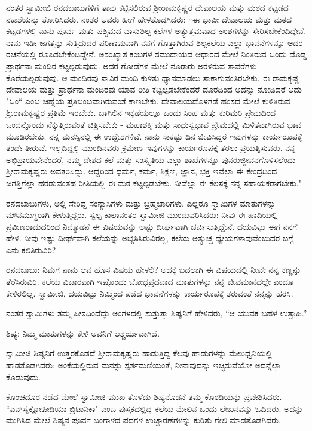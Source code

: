 ನಂತರ ಸ್ವಾಮೀಜಿ ರನದಬಾಬುಗಳಿಗೆ ತಾವು ಕಟ್ಟಿಸಲಿರುವ ಶ‍್ರೀರಾಮಕೃಷ್ಣರ ದೇವಾಲಯ ಮತ್ತು ಮಠದ ಕಟ್ಟಡದ ನಕಾಶೆಯನ್ನು ತೋರಿಸಿದರು. ನಂತರ ಅವರು ಹೀಗೆ ಹೇಳತೊಡಗಿದರು: “ಈ ಭಾವೀ ದೇವಾಲಯ ಮತ್ತು ಮಠದ ಕಟ್ಟಡಗಳಲ್ಲಿ ನಾನು ಪೂರ್ವ ಮತ್ತು ಪಶ್ಚಿಮದ ವಾಸ್ತುಶಿಲ್ಪ ಕಲೆಗಳ ಅತ್ಯುತ್ತಮವಾದ ಅಂಶಗಳನ್ನು ಸೇರಿಸಬೇಕೆಂದಿದ್ದೇನೆ. ನಾನು ಇಡೀ ಜಗತ್ತನ್ನು ಸುತ್ತಿದುದರ ಪರಿಣಾಮವಾಗಿ ನನಗೆ ಗೊತ್ತಾಗಿರುವ ಶಿಲ್ಪಕಲೆಯ ಎಲ್ಲಾ ಭಾವನೆಗಳನ್ನೂ ಅದರ ರಚನೆಯಲ್ಲಿ ರೂಪಿಸಬೇಕೆಂದಿದ್ದೇನೆ. ಅಸಂಖ್ಯಾತ ಕಂಬಗಳ ಸಮುದಾಯದ ಆಧಾರದ ಮೇಲೆ ನಿಂತಿರುವ ಒಂದು ದೊಡ್ಡ ಪ್ರಾರ್ಥನಾ ಮಂದಿರ ಕಟ್ಟಲ್ಪಡುವುದು. ಅದರ ಗೋಡೆಗಳ ಮೇಲೆ ನೂರಾರು ಅರಳಿರುವ ತಾವರೆಗಳು ಕೊರೆಯಲ್ಪಡುವುವು. ಆ ಮಂದಿರವು ಸಾವಿರ ಮಂದಿ ಕುಳಿತು ಧ್ಯಾನಮಾಡಲು ಸಾಕಾಗುವಂತಿರಬೇಕು. ಈ ರಾಮಕೃಷ್ಣ ದೇವಾಲಯ ಮತ್ತು ಪ್ರಾರ್ಥನಾ ಮಂದಿರವು ಯಾವ ರೀತಿ ಕಟ್ಟಲ್ಪಡಬೇಕೆಂದರೆ ದೂರದಿಂದ ಅದನ್ನು ನೋಡಿದರೆ ಅದು "ಓಂ“ ಎಂಬ ಚಿಹ್ನೆಯ ಪ್ರತಿಬಿಂಬವಾಗಿರುವಂತೆ ಕಾಣಬೇಕು. ದೇವಾಲಯದೊಳಗಡೆ ಹಂಸದ ಮೇಲೆ ಕುಳಿತಿರುವ ಶ‍್ರೀರಾಮಕೃಷ್ಣರ ಪ್ರತಿಮೆ ಇರಬೇಕು. ಬಾಗಿಲಿನ ಇಕ್ಕೆಡೆಯಲ್ಲೂ ಒಂದು ಸಿಂಹ ಮತ್ತು ಕುರಿಮರಿ ಪ್ರೇಮದಿಂದ ಒಂದನ್ನೊಂದು ನೆಕ್ಕುತ್ತಿರುವಂತೆ ಚಿತ್ರಿಸಬೇಕು - ಮಹಾಶಕ್ತಿ ಮತ್ತು ಸಾಧುಸ್ವಭಾವ ಪ್ರೇಮದಲ್ಲಿ ಮಿಳಿತವಾಗಿರುವ ಭಾವ ಮೂಡಿರಬೇಕು. ನನ್ನ ಮನಸ್ಸಿನಲ್ಲಿ ಈ ಉದ್ದೇಶಗಳಿವೆ. ನಾನು ಸಾಕಷ್ಟು ದಿನ ಜೀವಿಸಿದ್ದರೆ ಇವುಗಳನ್ನು ಕಾರ್ಯರೂಪಕ್ಕೆ ತಂದೇ ತೀರುವೆ. ಇಲ್ಲದಿದ್ದಲ್ಲಿ ಮುಂದಿನವರು ಕ್ರಮೇಣ ಇವುಗಳನ್ನು ಕಾರ್ಯರೂಪಕ್ಕೆ ತರಲು ಪ್ರಯತ್ನಿಸುವರು. ನನ್ನ ಅಭಿಪ್ರಾಯವೇನೆಂದರೆ, ನಮ್ಮ ದೇಶದ ಕಲೆ ಮತ್ತು ಸಂಸ್ಕೃತಿಯ ಎಲ್ಲಾ ಶಾಖೆಗಳನ್ನೂ ಪುನರುಜ್ಜೀವನಗೊಳಿಸಲೆಂದು ಶ‍್ರೀರಾಮಕೃಷ್ಣರು ಅವತರಿಸಿದ್ದು. ಆದ್ದರಿಂದ ಧರ್ಮ, ಕರ್ಮ, ಶಿಕ್ಷಣ, ಜ್ಞಾನ, ಭಕ್ತಿ ಇವೆಲ್ಲಾ ಈ ಕೇಂದ್ರದಿಂದ ಜಗತ್ತಿಗೆಲ್ಲಾ ಹರಡುವಂತಹ ರೀತಿಯಲ್ಲಿ ಈ ಮಠ ಕಟ್ಟಲ್ಪಡಬೇಕು. ನೀವೆಲ್ಲಾ ಈ ಕೆಲಸಕ್ಕೆ ನನ್ನ ಸಹಾಯಕರಾಗಬೇಕು."

ರನದಬಾಬುಗಳು, ಅಲ್ಲಿ ಸೇರಿದ್ದ ಸಂನ್ಯಾಸಿಗಳು ಮತ್ತು ಬ್ರಹ್ಮಚಾರಿಗಳು, ಎಲ್ಲರೂ ಸ್ವಾಮಿಗಳ ಮಾತುಗಳನ್ನು ಮೌನಮುಗ್ಧರಾಗಿ ಕೇಳುತ್ತಿದ್ದರು. ಸ್ವಲ್ಪ ಕಾಲಾನಂತರ ಸ್ವಾಮೀಜಿ ಮುಂದುವರಿಸಿದರು: ನೀವು ಈ ಹಾದಿಯಲ್ಲಿ ಪ್ರವೀಣರಾದುದರಿಂದ ನಿಮ್ಮೊಡನೆ ಈ ವಿಷಯವನ್ನು ಅಷ್ಟು ದೀರ್ಘವಾಗಿ ಚರ್ಚಿಸುತ್ತಿದ್ದೇನೆ. ದಯವಿಟ್ಟು ಈಗ ನನಗೆ ಹೇಳಿ. ನೀವು ಇಷ್ಟು ದೀರ್ಘವಾಗಿ ಕಲೆಯನ್ನು ಅಭ್ಯಸಿಸಿರುವಿರಲ್ಲ, ಕಲೆಯ ಅತ್ಯುಚ್ಚ ಧ್ಯೇಯಗಳಾವುವೆಂಬುದರ ಬಗ್ಗೆ ಏನು ಕಲಿತಿರುವಿರಿ?

ರನದಬಾಬು: ನಿಮಗೆ ನಾನು ಆವ ಹೊಸ ವಿಷಯ ಹೇಳಲಿ? ಅದಕ್ಕೆ ಬದಲಾಗಿ ಈ ವಿಷಯದಲ್ಲಿ ನೀವೇ ನನ್ನ ಕಣ್ಣನ್ನು ತೆರೆಸಿರುವಿರಿ. ಕಲೆಯ ವಿಚಾರವಾಗಿ ಇಷ್ಟೊಂದು ಬೋಧಪ್ರದವಾದ ಮಾತುಗಳನ್ನು ನನ್ನ ಜೀವಮಾನದಲ್ಲೇ ಎಂದೂ ಕೇಳಿರಲಿಲ್ಲ. ಸ್ವಾಮೀಜಿ, ದಯವಿಟ್ಟು ನಿಮ್ಮಿಂದ ಪಡೆದ ಭಾವನೆಗಳನ್ನು ಕಾರ್ಯರೂಪಕ್ಕೆ ತರುವಂತೆ ನನ್ನನ್ನು ಹರಸಿ.

ನಂತರ ಸ್ವಾಮಿಗಳು ತಮ್ಮ ಪೀಠದಿಂದೆದ್ದು ಅಂಗಳದಲ್ಲಿ ಸುತ್ತುತ್ತಾ ಶಿಷ್ಯನಿಗೆ ಹೇಳಿದರು, “ಆ ಯುವಕ ಬಹಳ ಉತ್ಸಾಹಿ.”

ಶಿಷ್ಯ: ನಿಮ್ಮ ಮಾತುಗಳನ್ನು ಕೇಳಿ ಅವನಿಗೆ ಆಶ್ಚರ್ಯವಾಗಿದೆ.

ಸ್ವಾಮೀಜಿ ಶಿಷ್ಯನಿಗೆ ಉತ್ತರಕೊಡದೆ ಶ‍್ರೀರಾಮಕೃಷ್ಣರು ಹಾಡುತ್ತಿದ್ದ ಕೆಲವು ಹಾಡುಗಳನ್ನು ಮೆಲುಧ್ವನಿಯಲ್ಲಿ ಹಾಡತೊಡಗಿದರು: ಅಂಕೆಯಲ್ಲಿರುವ ಮನಸ್ಸು ಸ್ಪರ್ಶಮಣಿಯಂತೆ, ನೀನಾವುದನ್ನು ಇಚ್ಛಿಸುವೆಯೋ ಅದನ್ನೆಲ್ಲಾ ಕೊಡುವುದು.

ಕೊಂಚದೂರ ನಡೆದ ಮೇಲೆ ಸ್ವಾಮೀಜಿ ಮುಖ ತೊಳೆದು ಶಿಷ್ಯನೊಡನೆ ತಮ್ಮ ಕೊಠಡಿಯನ್ನು ಪ್ರವೇಶಿಸಿದರು. “ಎನ್‌ಸೈಕ್ಲೋಪೀಡಿಯಾ ಬ್ರಿಟಾನಿಕಾ" ಎಂಬ ಪುಸ್ತಕದಲ್ಲಿದ್ದ ಕಲೆಯ ಮೇಲಿನ ಒಂದು ಲೇಖನವನ್ನು ಓದಿದರು. ಅದನ್ನು ಮುಗಿಸಿದ ಮೇಲೆ ಶಿಷ್ಯನ ಪೂರ್ವ ಬಂಗಾಳದ ಪದಗಳ ಉಚ್ಚಾರಣೆಗಳನ್ನು ಕುರಿತು ಗೇಲಿ ಮಾಡತೊಡಗಿದರು.

